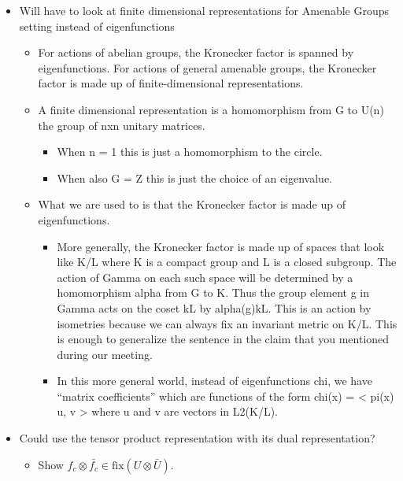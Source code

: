 \documentclass[
  british,
]{article}
\providecommand{\tightlist}{%
  \setlength{\itemsep}{0pt}\setlength{\parskip}{0pt}}
\theoremstyle{plain}
\theoremstyle{plain}
\theoremstyle{plain}
\theoremstyle{definition}
\theoremstyle{remark}
\begin{document}
\begin{itemize}
\tightlist
\item
  Will have to look at finite dimensional representations for Amenable
  Groups setting instead of eigenfunctions

  \begin{itemize}
  \tightlist
  \item
    For actions of abelian groups, the Kronecker factor is spanned by
    eigenfunctions. For actions of general amenable groups, the
    Kronecker factor is made up of finite-dimensional representations.
  \item
    A finite dimensional representation is a homomorphism from G to U(n)
    the group of nxn unitary matrices.

    \begin{itemize}
    \tightlist
    \item
      When n = 1 this is just a homomorphism to the circle.
    \item
      When also G = Z this is just the choice of an eigenvalue.
    \end{itemize}
  \item
    What we are used to is that the Kronecker factor is made up of
    eigenfunctions.

    \begin{itemize}
    \tightlist
    \item
      More generally, the Kronecker factor is made up of spaces that
      look like K/L where K is a compact group and L is a closed
      subgroup. The action of Gamma on each such space will be
      determined by a homomorphism alpha from G to K. Thus the group
      element g in Gamma acts on the coset kL by alpha(g)kL. This is an
      action by isometries because we can always fix an invariant metric
      on K/L. This is enough to generalize the sentence in the claim
      that you mentioned during our meeting.
    \item
      In this more general world, instead of eigenfunctions chi, we have
      ``matrix coefficients'' which are functions of the form chi(x) =
      \textless{} pi(x) u, v \textgreater{} where u and v are vectors in
      L2(K/L).
    \end{itemize}
  \end{itemize}
\item
  Could use the tensor product representation with its dual
  representation?

  \begin{itemize}
  \tightlist
  \item
    Show \(f_c\otimes\bar{f_c}\in\text{fix}(U\otimes\bar{U})\).


\end{itemize}
\end{itemize}
\end{document}
